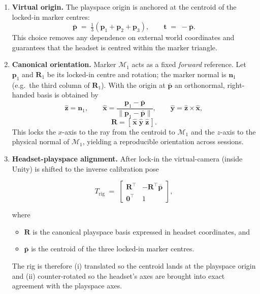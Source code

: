 \begin{enumerate}
        
    \item \textbf{Virtual origin.}\;
          The playspace origin is anchored at the centroid of the locked-in
          marker centres:
          \[
            \bar{\mathbf p}\;=\;\tfrac13(\mathbf p_1+\mathbf p_2+\mathbf p_3),
            \qquad
            \mathbf t\;=\;-\bar{\mathbf p}.
          \]
          This choice removes any dependence on external world coordinates and
          guarantees that the headset is centred within the marker triangle.
    
    \item \textbf{Canonical orientation.}\;
    Marker $\mathcal M_1$ acts as a fixed \emph{forward} reference.
    Let \(\mathbf p_1\) and \(\mathbf R_1\) be its locked-in
    centre and rotation; the marker normal is
    \(\mathbf n_1\) (e.g.\ the third column of \(\mathbf R_1\)).
    With the origin at \(\bar{\mathbf p}\) an orthonormal, right-handed
    basis is obtained by
    \[
      \hat{\mathbf z}=\mathbf n_1,\qquad
      \hat{\mathbf x}=\frac{\mathbf p_1-\bar{\mathbf p}}
                           {\|\mathbf p_1-\bar{\mathbf p}\|},\qquad
      \hat{\mathbf y}=\hat{\mathbf z}\times\hat{\mathbf x},
    \]
    \[
      \mathbf R=[\,\hat{\mathbf x}\;\hat{\mathbf y}\;\hat{\mathbf z}\,].
    \]
    This locks the $x$-axis to the ray from the centroid to
    \(\mathcal M_1\) and the $z$-axis to the physical normal of
    \(\mathcal M_1\), yielding a reproducible orientation across
    sessions.    
    
    \item \textbf{Headset-playspace alignment.}\;
    After lock-in the virtual-camera (inside Unity) is shifted to the inverse
    calibration pose  

    \[
      T_{\text{rig}}
      \;=\;
      \begin{bmatrix}
        \mathbf R^{\!\top} & -\mathbf R^{\!\top}\bar{\mathbf p}\\[2pt]
        \mathbf 0^{\!\top} & 1
      \end{bmatrix},
    \]

    where  

    \begin{itemize}
    \item \(\mathbf R\) is the canonical playspace basis expressed in
      headset coordinates, and  
    \item \(\bar{\mathbf p}\) is the centroid of the three locked-in marker
      centres.
    \end{itemize}

    The rig is therefore (i) translated so the centroid lands at the playspace origin and (ii) counter-rotated so the headset's axes are brought into exact agreement with the playspace axes.
  
    \end{enumerate}

